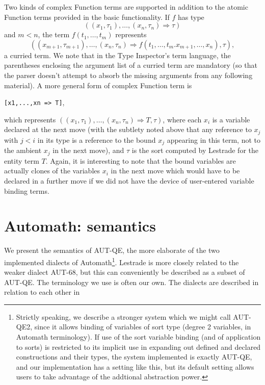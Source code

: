 \documentclass{article}
\begin{document}
Two kinds of complex Function terms are supported in addition to the atomic Function terms provided in the basic functionality.  If $f$ has
type $$((x_1,\tau_1),\ldots,(x_n,\tau_n) \Rightarrow \tau)$$ and $m<n$, the term $f(t_1,\ldots,t_m)$ represents
$$((x_{m+1},\tau_{m+1}),\ldots,(x_n,\tau_n) \Rightarrow f(t_1,\ldots,t_m.x_{m+1},\ldots,x_n),\tau),$$ a curried term.  We note that in the Type Inspector's term language, the parentheses enclosing the argument list of a curried term are mandatory (so that the parser doesn't attempt to absorb the missing arguments from any following material).  A more general form of complex Function term is \begin{center}{\tt [x1,...,xn => T]},\end{center}which represents
$((x_1,\tau_1),\ldots,(x_n,\tau_n) \Rightarrow T,\tau)$, where each $x_i$ is a variable declared at the next move (with the subtlety noted above that
any reference to $x_j$ with $j<i$ in its type is a reference to the bound $x_j$ appearing in this term, not to the ambient $x_j$ in the next move), and $\tau$ is the sort computed by Lestrade for the entity term $T$.  Again, it is interesting to note that the bound variables are actually clones of the variables $x_i$ in the next move which would have to be declared in a further move if we did not have the device of user-entered variable binding terms.



\section{Automath:  semantics}

We present the semantics of AUT-QE, the more elaborate of the two implemented dialects of Automath\footnote{Strictly speaking, we describe a stronger system which we might call AUT-QE2, since it allows binding of variables of sort type (degree 2 variables, in Automath terminology).  If use of the sort variable binding (and of application to sorts) is restricted to its implicit use in expanding out defined and declared constructions  and their types, the system implemented is exactly AUT-QE, and our implementation has a setting like this, but its default setting allows users to take advantage of the addtional abstraction power.}.  Lestrade is more closely related to the weaker dialect AUT-68, but this can conveniently be described as a subset of AUT-QE.  The terminology we use is often our own.  The dialects are described in relation to each other in \cite{vandaalena3}
\end{document}
